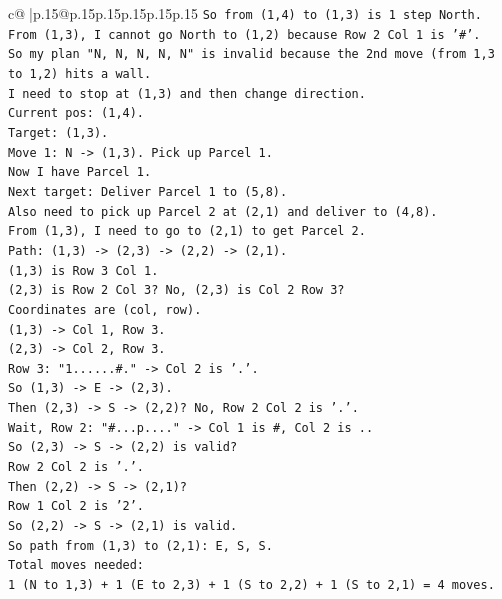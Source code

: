 \documentclass{article}
\begin{document}
{\begin{supertabular}{c@{$\;$}|p{.15\linewidth}@{}p{.15\linewidth}p{.15\linewidth}p{.15\linewidth}p{.15\linewidth}p{.15\linewidth}}
{{{\texttt{So from (1,4) to (1,3) is 1 step North.} \\
\texttt{From (1,3), I cannot go North to (1,2) because Row 2 Col 1 is '\#'.} \\
\texttt{So my plan "N, N, N, N, N" is invalid because the 2nd move (from 1,3 to 1,2) hits a wall.} \\
\texttt{I need to stop at (1,3) and then change direction.} \\
\texttt{Current pos: (1,4).} \\
\texttt{Target: (1,3).} \\
\texttt{Move 1: N {-}> (1,3). Pick up Parcel 1.} \\
\texttt{Now I have Parcel 1.} \\
\texttt{Next target: Deliver Parcel 1 to (5,8).} \\
\texttt{Also need to pick up Parcel 2 at (2,1) and deliver to (4,8).} \\
\texttt{From (1,3), I need to go to (2,1) to get Parcel 2.} \\
\texttt{Path: (1,3) {-}> (2,3) {-}> (2,2) {-}> (2,1).} \\
\texttt{(1,3) is Row 3 Col 1.} \\
\texttt{(2,3) is Row 2 Col 3? No, (2,3) is Col 2 Row 3?} \\
\texttt{Coordinates are (col, row).} \\
\texttt{(1,3) {-}> Col 1, Row 3.} \\
\texttt{(2,3) {-}> Col 2, Row 3.} \\
\texttt{Row 3: "1......\#." {-}> Col 2 is '.'.} \\
\texttt{So (1,3) {-}> E {-}> (2,3).} \\
\texttt{Then (2,3) {-}> S {-}> (2,2)? No, Row 2 Col 2 is '.'.} \\
\texttt{Wait, Row 2: "\#...p...." {-}> Col 1 is \#, Col 2 is ..} \\
\texttt{So (2,3) {-}> S {-}> (2,2) is valid?} \\
\texttt{Row 2 Col 2 is '.'.} \\
\texttt{Then (2,2) {-}> S {-}> (2,1)?} \\
\texttt{Row 1 Col 2 is '2'.} \\
\texttt{So (2,2) {-}> S {-}> (2,1) is valid.} \\
\texttt{So path from (1,3) to (2,1): E, S, S.} \\
\texttt{Total moves needed:} \\
\texttt{1 (N to 1,3) + 1 (E to 2,3) + 1 (S to 2,2) + 1 (S to 2,1) = 4 moves.} \\
}}}
\end{supertabular}}
\end{document}
